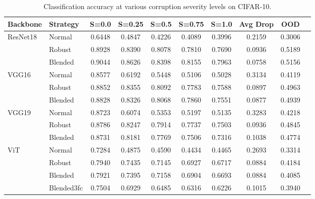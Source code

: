 \documentclass[11pt,a4paper]{article}
\begin{document}
\begin{table}[H]
\centering
\caption{Classification accuracy at various corruption severity levels on CIFAR-10.}
\label{tab:main_results}
\small
\begin{tabular}{llcccccccc}
\toprule
\textbf{Backbone} & \textbf{Strategy} & \textbf{S=0.0} & \textbf{S=0.25} & \textbf{S=0.5} & \textbf{S=0.75} & \textbf{S=1.0} & \textbf{Avg Drop} & \textbf{OOD} \\
\midrule
ResNet18 & Normal & 0.6448 & 0.4847 & 0.4226 & 0.4089 & 0.3996 & 0.2159 & 0.3006 \\
 & Robust & 0.8928 & 0.8390 & 0.8078 & 0.7810 & 0.7690 & 0.0936 & 0.5189 \\
 & Blended & 0.9044 & 0.8626 & 0.8398 & 0.8155 & 0.7963 & 0.0758 & 0.5156 \\
\midrule
VGG16 & Normal & 0.8577 & 0.6192 & 0.5448 & 0.5106 & 0.5028 & 0.3134 & 0.4119 \\
 & Robust & 0.8852 & 0.8355 & 0.8092 & 0.7783 & 0.7588 & 0.0897 & 0.4963 \\
 & Blended & 0.8828 & 0.8326 & 0.8068 & 0.7860 & 0.7551 & 0.0877 & 0.4939 \\
\midrule
VGG19 & Normal & 0.8723 & 0.6074 & 0.5353 & 0.5197 & 0.5135 & 0.3283 & 0.4218 \\
 & Robust & 0.8786 & 0.8247 & 0.7914 & 0.7737 & 0.7503 & 0.0936 & 0.4845 \\
 & Blended & 0.8731 & 0.8181 & 0.7769 & 0.7506 & 0.7316 & 0.1038 & 0.4774 \\
\midrule
ViT & Normal & 0.7284 & 0.4875 & 0.4590 & 0.4434 & 0.4465 & 0.2693 & 0.3314 \\
 & Robust & 0.7940 & 0.7435 & 0.7145 & 0.6927 & 0.6717 & 0.0884 & 0.4184 \\
 & Blended & 0.7921 & 0.7395 & 0.7158 & 0.6904 & 0.6693 & 0.0884 & 0.4085 \\
 & Blended3fc & 0.7504 & 0.6929 & 0.6485 & 0.6316 & 0.6226 & 0.1015 & 0.3940 \\
\midrule
\bottomrule
\end{tabular}
\end{table}
\end{document}
